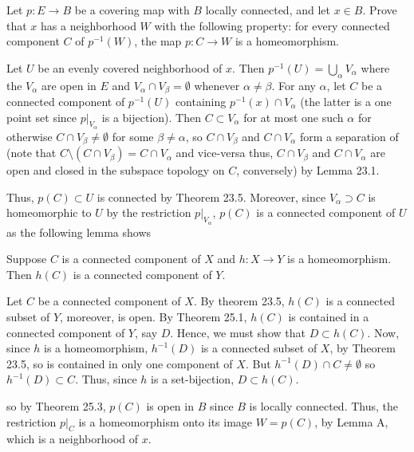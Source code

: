 \begin{problem}
  Let $p\colon E\to B$ be a covering map with $B$ locally connected, and
  let $x\in B$. Prove that $x$ has a neighborhood $W$ with the following
  property: for every connected component $C$ of $p^{-1}(W)$, the map
  $p\colon C\to W$ is a homeomorphism.
\end{problem}
\begin{solution}
  Let $U$ be an evenly covered neighborhood of $x$. Then
  $p^{-1}(U)=\bigcup_\alpha V_\alpha$ where the $V_\alpha$ are open in $E$
  and $V_\alpha\cap V_\beta=\emptyset$ whenever $\alpha\neq\beta$. For any
  $\alpha$, let $C$ be a connected component of $p^{-1}(U)$ containing
  $p^{-1}(x)\cap V_\alpha$ (the latter is a one point set since
  $\left.p\right|_{V_\alpha}$ is a bijection). Then $C\subset V_\alpha$ for
  at most one such $\alpha$ for otherwise $C\cap V_\beta\neq\emptyset$ for
  some $\beta\neq\alpha$, so $C\cap V_\beta$ and $C\cap V_\alpha$ form a
  separation of (note that $C\setminus(C\cap V_\beta)=C\cap V_\alpha$
  and vice-versa thus, $C\cap V_\beta$ and $C\cap V_\alpha$ are open and
  closed in the subspace topology on $C$, conversely) by Lemma 23.1.

  Thus, $p(C)\subset U$ is connected by Theorem 23.5. Moreover, since
  $V_\alpha\supset C$ is homeomorphic to $U$ by the restriction
  $\left.p\right|_{V_\alpha}$, $p(C)$ is a connected component of $U$ as
  the following lemma shows
  \begin{lemma}
    Suppose $C$ is a connected component of $X$ and $h\colon X\to Y$ is a
    homeomorphism. Then $h(C)$ is a connected component of $Y$.
  \end{lemma}
  \begin{solution}
    \renewcommand\qedsymbol{$\clubsuit$} Let $C$ be a connected component
    of $X$. By theorem 23.5, $h(C)$ is a connected subset of $Y$, moreover,
    is open. By Theorem 25.1, $h(C)$ is contained in a connected component
    of $Y$, say $D$. Hence, we must show that $D\subset h(C)$. Now, since
    $h$ is a homeomorphism, $h^{-1}(D)$ is a connected subset of $X$, by
    Theorem 23.5, so is contained in only one component of $X$. But
    $h^{-1}(D)\cap C\neq\emptyset$ so $h^{-1}(D)\subset C$. Thus, since $h$
    is a set-bijection, $D\subset h(C)$.
  \end{solution}
  so by Theorem 25.3, $p(C)$ is open in $B$ since $B$ is locally
  connected. Thus, the restriction $\left.p\right|_{C}$ is a homeomorphism
  onto its image $W= p(C)$, by Lemma A, which is a neighborhood of $x$.
\end{solution}

